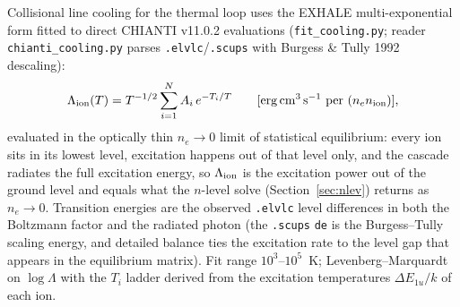 \documentclass[english,a4paper]{my_memo}
\newcommand{\code}[1]{\texttt{#1}}
\begin{document}
Collisional line cooling for the thermal loop uses the EXHALE
multi-exponential form fitted to direct CHIANTI v11.0.2 evaluations
(\code{fit\_cooling.py}; reader \code{chianti\_cooling.py} parses
\code{.elvlc}/\code{.scups} with Burgess \& Tully 1992 descaling):
\begin{equation}
  \Lambda_{\rm ion}(T) = T^{-1/2}\sum_{i=1}^{N} A_i\,e^{-T_i/T}
  \qquad [\mathrm{erg\,cm^3\,s^{-1}}\ \text{per } (n_e n_{\rm ion})],
  \label{eq:cool}
\end{equation}
evaluated in the optically thin $n_e\rightarrow0$ limit of statistical
equilibrium: every ion sits in its lowest level, excitation happens out
of that level only, and the cascade radiates the full excitation energy,
so $\Lambda_{\rm ion}$ is the excitation power out of the ground level
and equals what the $n$-level solve (Section~\ref{sec:nlev}) returns as
$n_e\rightarrow0$.  Transition energies are the observed \code{.elvlc}
level differences in both the Boltzmann factor and the radiated photon
(the \code{.scups} \code{de} is the Burgess--Tully scaling energy, and
detailed balance ties the excitation rate to the level gap that appears
in the equilibrium matrix).  Fit range $10^3$--$10^5$~K;
Levenberg--Marquardt on $\log\Lambda$ with the $T_i$ ladder derived from
the excitation temperatures $\Delta E_{1u}/k$ of each ion.
\end{document}
